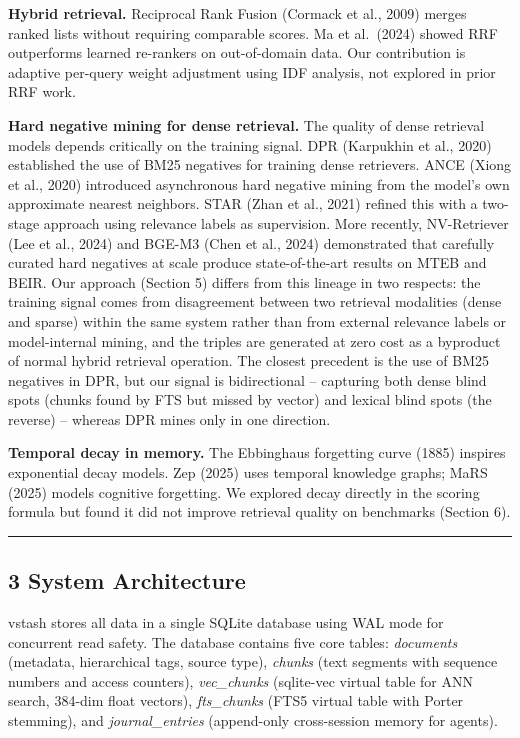 \documentclass[
  11pt]{article}
\begin{document}
\textbf{Hybrid retrieval.} Reciprocal Rank Fusion (Cormack et al., 2009) merges ranked lists without requiring comparable scores. Ma et al.~(2024) showed RRF outperforms learned re-rankers on out-of-domain data. Our contribution is adaptive per-query weight adjustment using IDF analysis, not explored in prior RRF work.

\textbf{Hard negative mining for dense retrieval.} The quality of dense retrieval models depends critically on the training signal. DPR (Karpukhin et al., 2020) established the use of BM25 negatives for training dense retrievers. ANCE (Xiong et al., 2020) introduced asynchronous hard negative mining from the model's own approximate nearest neighbors. STAR (Zhan et al., 2021) refined this with a two-stage approach using relevance labels as supervision. More recently, NV-Retriever (Lee et al., 2024) and BGE-M3 (Chen et al., 2024) demonstrated that carefully curated hard negatives at scale produce state-of-the-art results on MTEB and BEIR. Our approach (Section 5) differs from this lineage in two respects: the training signal comes from disagreement between two retrieval modalities (dense and sparse) within the same system rather than from external relevance labels or model-internal mining, and the triples are generated at zero cost as a byproduct of normal hybrid retrieval operation. The closest precedent is the use of BM25 negatives in DPR, but our signal is bidirectional -- capturing both dense blind spots (chunks found by FTS but missed by vector) and lexical blind spots (the reverse) -- whereas DPR mines only in one direction.

\textbf{Temporal decay in memory.} The Ebbinghaus forgetting curve (1885) inspires exponential decay models. Zep (2025) uses temporal knowledge graphs; MaRS (2025) models cognitive forgetting. We explored decay directly in the scoring formula but found it did not improve retrieval quality on benchmarks (Section 6).

\begin{center}\rule{0.5\linewidth}{0.5pt}\end{center}

\subsection{3 System Architecture}\label{system-architecture}

vstash stores all data in a single SQLite database using WAL mode for concurrent read safety. The database contains five core tables: \emph{documents} (metadata, hierarchical tags, source type), \emph{chunks} (text segments with sequence numbers and access counters), \emph{vec\_chunks} (sqlite-vec virtual table for ANN search, 384-dim float vectors), \emph{fts\_chunks} (FTS5 virtual table with Porter stemming), and \emph{journal\_entries} (append-only cross-session memory for agents).
\end{document}
